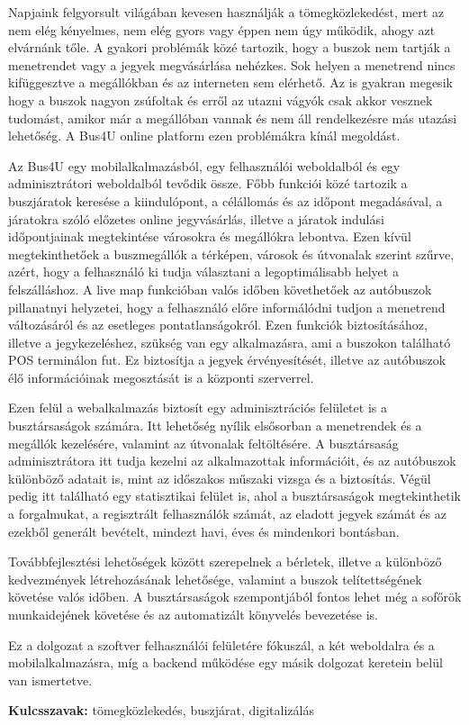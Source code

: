 Napjaink felgyorsult világában kevesen használják a tömegközlekedést, mert az nem elég kényelmes, nem elég gyors vagy éppen nem úgy működik, ahogy azt elvárnánk tőle. A gyakori problémák közé tartozik, hogy a buszok nem tartják a menetrendet vagy a jegyek megvásárlása nehézkes. Sok helyen a menetrend nincs kifüggesztve a megállókban és az interneten sem elérhető. Az is gyakran megesik hogy a buszok nagyon zsúfoltak és erről az utazni vágyók csak akkor vesznek tudomást, amikor már a megállóban vannak és nem áll rendelkezésre más utazási lehetőség. A Bus4U online platform ezen problémákra kínál megoldást.

Az Bus4U egy mobilalkalmazásból, egy felhasználói weboldalból és egy adminisztrátori weboldalból tevődik össze. Főbb funkciói közé tartozik a buszjáratok keresése a kiindulópont, a célállomás és az időpont megadásával, a járatokra szóló előzetes online jegyvásárlás, illetve a járatok indulási időpontjainak megtekintése városokra és megállókra lebontva. Ezen kívül megtekinthetőek a buszmegállók a térképen, városok és útvonalak szerint szűrve, azért, hogy a felhasználó ki tudja választani a legoptimálisabb helyet a felszálláshoz. A live map funkcióban valós időben követhetőek az autóbuszok pillanatnyi helyzetei, hogy a felhasználó előre informálódni tudjon a menetrend változásáról és az esetleges pontatlanságokról. Ezen funkciók biztosításához, illetve a jegykezeléshez, szükség van egy alkalmazásra, ami a buszokon található POS terminálon fut. Ez biztosítja a jegyek érvényesítését, illetve az autóbuszok élő információinak megosztását is a központi szerverrel.

Ezen felül a webalkalmazás biztosít egy adminisztrációs felületet is a busztársaságok számára. Itt lehetőség nyílik elsősorban a menetrendek és a megállók kezelésére, valamint az útvonalak feltöltésére. A busztársaság adminisztrátora itt tudja kezelni az alkalmazottak információit, és az autóbuszok különböző adatait is, mint az időszakos műszaki vizsga és a biztosítás. Végül pedig itt található egy statisztikai felület is, ahol a busztársaságok megtekinthetik a forgalmukat, a regisztrált felhasználók számát, az eladott jegyek számát és az ezekből generált bevételt, mindezt havi, éves és mindenkori bontásban.

Továbbfejlesztési lehetőségek között szerepelnek a bérletek, illetve a különböző kedvezmények létrehozásának lehetősége, valamint a buszok telítettségének követése valós időben. A busztársaságok szempontjából fontos lehet még a sofőrök munkaidejének követése és az automatizált könyvelés bevezetése is.

Ez a dolgozat a szoftver felhasználói felületére fókuszál, a két weboldalra és a mobilalkalmazásra, míg a backend működése egy másik dolgozat keretein belül van ismertetve.

\textbf{Kulcsszavak:} tömegközlekedés, buszjárat, digitalizálás